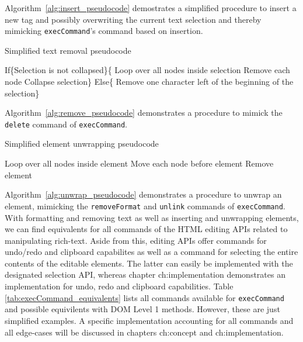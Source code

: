 Algorithm~\ref{alg:insert_pseudocode} demostrates a simplified procedure to insert a new tag and possibly overwriting the current text selection and thereby mimicking \texttt{execCommand}'s command based on insertion.

\begin{algorithm}
\caption{Simplified text removal pseudocode}
\label{alg:remove_pseudocode}
\begin{algorithmic}[1]
\State If\{Selection is not collapsed\}\{
\State Loop over all nodes inside selection
\State Remove each node
\State Collapse selection\}
\State Else\{
\State Remove one character left of the beginning of the selection\}
\end{algorithmic}
\end{algorithm}

Algorithm~\ref{alg:remove_pseudocode} demonstrates a procedure to mimick the \texttt{delete} command of \texttt{execCommand}.

\begin{algorithm}
\caption{Simplified element unwrapping pseudocode}
\label{alg:unwrap_pseudocode}
\begin{algorithmic}[1]
\State Loop over all nodes inside element
\State Move each node before element
\State Remove element
\end{algorithmic}
\end{algorithm}

Algorithm~\ref{alg:unwrap_pseudocode} demonstrates a procedure to unwrap an element, mimicking the \texttt{removeFormat} and \texttt{unlink} commands of \texttt{execCommand}.
With formatting and removing text as well as inserting and unwrapping elements, we can find equivalents for all commands of the HTML editing APIs related to manipulating rich-text. Aside from this, editing APIs offer commands for undo/redo and clipboard capabilites as well as a command for selecting the entire contents of the editable elements. The latter can easily be implemented with the designated selection API, whereas chapter {ch:implementation} demonstrates an implementation for undo, redo and clipboard capabilities. Table \ref{tab:execCommand_equivalents} lists all commands available for \texttt{execCommand} and possible equivilents with DOM Level 1 methods. However, these are just simplified examples. A specific implementation accounting for all commands and all edge-cases will be discussed in chapters {ch:concept} and {ch:implementation}.


